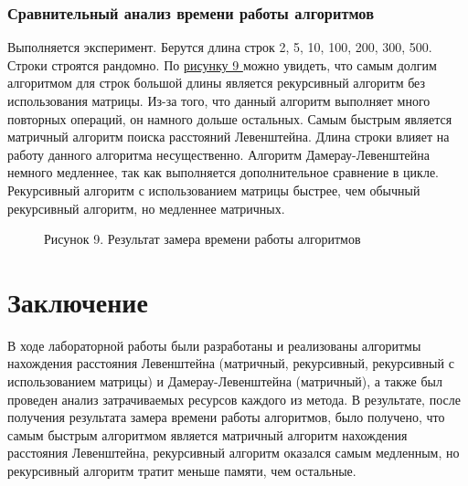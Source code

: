 \documentclass[12pt]{report}
\begin{document}
	\subsection{Сравнительный анализ времени работы алгоритмов}
	Выполняется эксперимент. Берутся длина строк 2, 5, 10, 100, 200, 300, 500. Строки строятся рандомно. По \hyperref[picture_9]{рисунку 9 } можно увидеть, что самым долгим алгоритмом для строк большой длины является рекурсивный алгоритм без использования матрицы. Из-за того, что данный алгоритм выполняет много повторных операций, он намного дольше остальных. Самым быстрым является матричный алгоритм поиска расстояний Левенштейна. Длина строки влияет на работу данного алгоритма несущественно. Алгоритм Дамерау-Левенштейна немного медленнее, так как выполняется дополнительное сравнение в цикле. Рекурсивный алгоритм с использованием матрицы быстрее, чем обычный рекурсивный алгоритм, но медленнее матричных.
	\begin{figure}[h]\label{picture_9}
		\caption*{Рисунок 9. Результат замера времени работы алгоритмов}
	\end{figure}
	\restoregeometry
	\onehalfspacing
	\chapter*{Заключение}
	В ходе лабораторной работы были разработаны и реализованы алгоритмы нахождения расстояния Левенштейна (матричный, рекурсивный, рекурсивный с использованием матрицы) и Дамерау-Левенштейна (матричный), а также был проведен анализ затрачиваемых ресурсов каждого из метода. В результате, после получения результата замера времени работы алгоритмов, было получено, что самым быстрым алгоритмом является матричный алгоритм нахождения расстояния Левенштейна, рекурсивный алгоритм оказался самым медленным, но рекурсивный алгоритм тратит меньше памяти, чем остальные.
	
\end{document}
